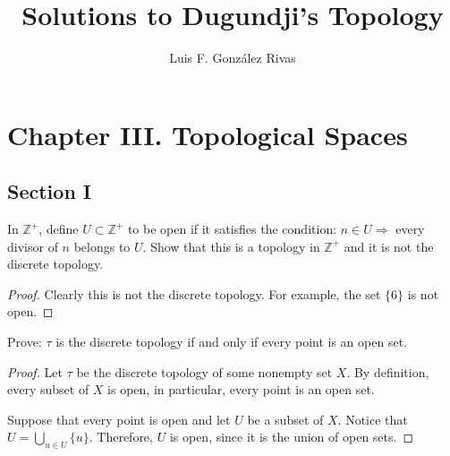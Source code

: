 \documentclass[12pt]{article}
\author{Luis F. Gonz\'alez Rivas}
\title{Solutions to Dugundji's Topology}
\newcommand{\Z}{\mathbb{Z}}
\begin{document}
\maketitle
\section*{Chapter III. Topological Spaces}
\subsection*{Section I}

\newenvironment{problem}[2][Problema]{\begin{trivlist}
\item[\hskip \labelsep {\bfseries #1}\hskip \labelsep {\bfseries #2.}]}{\end{trivlist}}

\begin{problem}{5} In $\Z^+$, define $U \subset \Z^+$ to be open if it satisfies the condition: $n \in U \Rightarrow $ every divisor of $n$ belongs to $U$. Show that this is a topology in $\Z^+$ and it is not the discrete topology.  
\end{problem}

\begin{proof}

Clearly this is not the discrete topology. For example, the set $\{6\}$ is not open.
\end{proof}

\begin{problem}{6} Prove: $\tau$ is the discrete topology if and only if every point is an open set.
\end{problem}
\begin{proof}
Let $\tau$ be the discrete topology of some nonempty set $X$. By definition, every subset of $X$ is open, in particular, every point is an open set. 

Suppose that every point is open and let $U$ be a subset of $X.$  Notice that $U = \bigcup_{u \in U} \{u\}$. Therefore, $U$ is open, since it is the union of open sets.
\end{proof}
\end{document}
